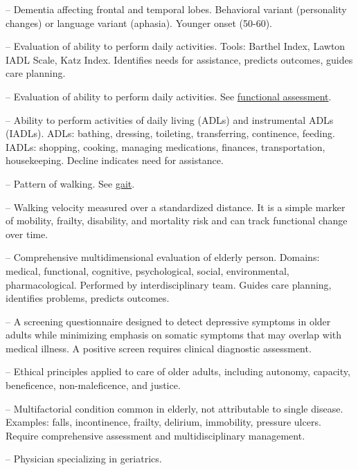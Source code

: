 -- Dementia affecting frontal and temporal lobes. Behavioral variant (personality changes) or language variant (aphasia). Younger onset (50-60).

-- Evaluation of ability to perform daily activities. Tools: Barthel Index, Lawton IADL Scale, Katz Index. Identifies needs for assistance, predicts outcomes, guides care planning.

-- Evaluation of ability to perform daily activities. See \hyperlink{Functional Assessment}{functional assessment}.

-- Ability to perform activities of daily living (ADLs) and instrumental ADLs (IADLs). ADLs: bathing, dressing, toileting, transferring, continence, feeding. IADLs: shopping, cooking, managing medications, finances, transportation, housekeeping. Decline indicates need for assistance.

-- Pattern of walking. See \hyperlink{Gait}{gait}.

-- Walking velocity measured over a standardized distance. It is a simple marker of mobility, frailty, disability, and mortality risk and can track functional change over time.

-- Comprehensive multidimensional evaluation of elderly person. Domains: medical, functional, cognitive, psychological, social, environmental, pharmacological. Performed by interdisciplinary team. Guides care planning, identifies problems, predicts outcomes.


-- A screening questionnaire designed to detect depressive symptoms in older adults while minimizing emphasis on somatic symptoms that may overlap with medical illness. A positive screen requires clinical diagnostic assessment.

-- Ethical principles applied to care of older adults, including autonomy, capacity, beneficence, non-maleficence, and justice.

-- Multifactorial condition common in elderly, not attributable to single disease. Examples: falls, incontinence, frailty, delirium, immobility, pressure ulcers. Require comprehensive assessment and multidisciplinary management.

-- Physician specializing in geriatrics.


